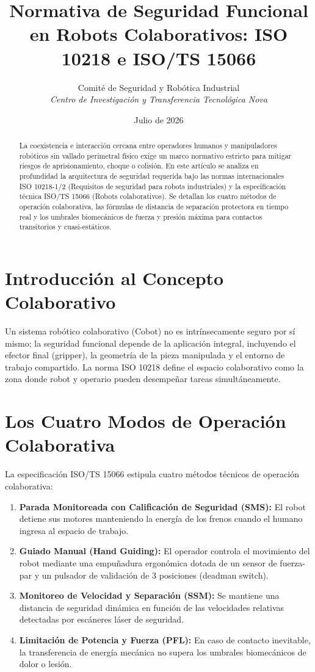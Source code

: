\documentclass[11pt,a4paper]{article}
\title{Normativa de Seguridad Funcional en Robots Colaborativos: ISO 10218 e ISO/TS 15066}
\author{Comité de Seguridad y Robótica Industrial \\
\textit{Centro de Investigación y Transferencia Tecnológica Nova}}
\date{Julio de 2026}
\begin{document}
\maketitle

\begin{abstract}
La coexistencia e interacción cercana entre operadores humanos y manipuladores robóticos sin vallado perimetral físico exige un marco normativo estricto para mitigar riesgos de aprisionamiento, choque o colisión. En este artículo se analiza en profundidad la arquitectura de seguridad requerida bajo las normas internacionales ISO 10218-1/2 (Requisitos de seguridad para robots industriales) y la especificación técnica ISO/TS 15066 (Robots colaborativos). Se detallan los cuatro métodos de operación colaborativa, las fórmulas de distancia de separación protectora en tiempo real y los umbrales biomecánicos de fuerza y presión máxima para contactos transitorios y cuasi-estáticos.
\end{abstract}

\section{Introducción al Concepto Colaborativo}
Un sistema robótico colaborativo (Cobot) no es intrínsecamente seguro por sí mismo; la seguridad funcional depende de la aplicación integral, incluyendo el efector final (gripper), la geometría de la pieza manipulada y el entorno de trabajo compartido. La norma ISO 10218 define el espacio colaborativo como la zona donde robot y operario pueden desempeñar tareas simultáneamente.

\section{Los Cuatro Modos de Operación Colaborativa}
La especificación ISO/TS 15066 estipula cuatro métodos técnicos de operación colaborativa:
\begin{enumerate}
    \item \textbf{Parada Monitoreada con Calificación de Seguridad (SMS):} El robot detiene sus motores manteniendo la energía de los frenos cuando el humano ingresa al espacio de trabajo.
    \item \textbf{Guiado Manual (Hand Guiding):} El operador controla el movimiento del robot mediante una empuñadura ergonómica dotada de un sensor de fuerza-par y un pulsador de validación de 3 posiciones (deadman switch).
    \item \textbf{Monitoreo de Velocidad y Separación (SSM):} Se mantiene una distancia de seguridad dinámica en función de las velocidades relativas detectadas por escáneres láser de seguridad.
    \item \textbf{Limitación de Potencia y Fuerza (PFL):} En caso de contacto inevitable, la transferencia de energía mecánica no supera los umbrales biomecánicos de dolor o lesión.
\end{enumerate}
\end{document}
